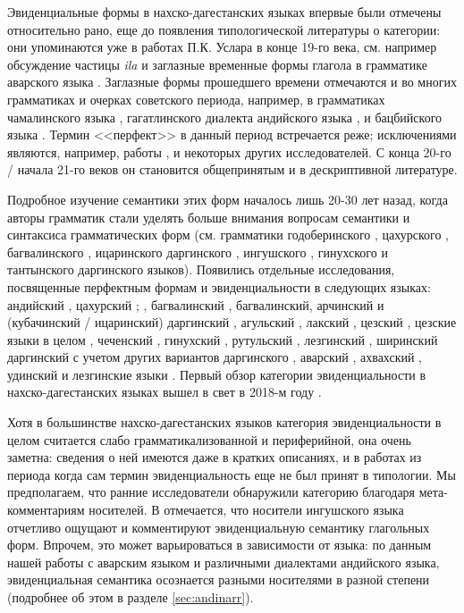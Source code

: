 Эвиденциальные формы в нахско-дагестанских языках впервые были отмечены относительно рано, еще до появления типологической литературы о категории: они упоминаются уже в работах П.К. Услара в конце 19-го века, см. например обсуждение частицы \textit{ila} и заглазные временные формы глагола в грамматике аварского языка \citep{uslar1889avar}. Заглазные формы прошедшего времени отмечаются и во многих грамматиках и очерках советского периода, например, в грамматиках чамалинского языка \citep{bokarev1949chamalal}, гагатлинского диалекта андийского языка \citep{salimov2010}, и бацбийского языка \citep{desheriev1953}. Термин <<перфект>> в данный период встречается реже; исключениями являются, например, работы \citep{tsertsvadze65}, \citep{kibriketal1972} и некоторых других исследователей. С конца 20-го / начала 21-го веков он становится общепринятым и в дескриптивной литературе. 
\par Подробное изучение семантики этих форм началось лишь 20-30 лет назад, когда авторы грамматик стали уделять больше внимания вопросам семантики и синтаксиса грамматических форм (см. грамматики годоберинского \citep{kibriketal1996}, цахурского \citep{tsakhurgram}, багвалинского \citep{bagvalalgram}, ицаринского даргинского \citep{sumbatovamutalov2003}, ингушского \citep{nichols2011}, гинухского \citep{forker2013} и тантынского даргинского \citep{sumbatovalander2014} языков). Появились отдельные исследования, посвященные перфектным формам и эвиденциальности в следующих языках: андийский \citep{kibrik1985}, цахурский \citep{tatevosovmaisak1999}; \citep{maisaktatevosov2007}, багвалинский \citep{tatevosov2003, tatevosov2007}, багвалинский, арчинский и (кубачинский / ицаринский) даргинский \citep{tatevosov2001}, агульский \citep{maisakmerdanova2002}, лакский \citep{friedman2007}, цезский \citep{comriepolinsky2007}, цезские языки в целом \citep{khalilova2011}, чеченский \citep{molochieva2010}, гинухский \citep{forker2014}, рутульский \citep{verhees2017}, лезгинский \citep{greed2017}, ширинский даргинский с учетом других вариантов даргинского \citep{belyaev2018}, аварский \citep{forker2018evidavar}, ахвахский \citep{creissels2018}, удинский \citep{maisak2018} и лезгинские языки \citep{maisaklezgpf}. Первый обзор категории эвиденциальности в нахско-дагестанских языках вышел в свет в 2018-м году \citep{forker2018evid}.
\par Хотя в большинстве нахско-дагестанских языков категория эвиденциальности в целом считается слабо грамматикализованной и периферийной, она очень заметна: сведения о ней имеются даже в кратких описаниях, и в работах из периода когда сам термин эвиденциальность еще не был принят в типологии. Мы предполагаем, что ранние исследователи обнаружили категорию благодаря мета-комментариям носителей. В \citep[234]{nichols2011} отмечается, что носители ингушского языка отчетливо ощущают и комментируют эвиденциальную семантику глагольных форм. Впрочем, это может варьироваться в зависимости от языка: по данным нашей работы с аварским языком и различными диалектами андийского языка, эвиденциальная семантика осознается разными носителями в разной степени (подробнее об этом в разделе \ref{sec:andinarr}).

